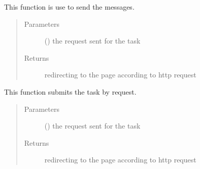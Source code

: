 \documentclass[letterpaper,10pt,english]{sphinxmanual}
\begin{document}
\begin{fulllineitems}
\label{\detokenize{janta:janta.views.send_message}}
This function is use to send the messages.
\begin{quote}\begin{description}
\item[{Parameters}] \leavevmode
{} () \textendash{} the request sent for the task

\item[{Returns}] \leavevmode
redirecting to the page according to http request

\end{description}\end{quote}

\end{fulllineitems}


\begin{fulllineitems}
\label{\detokenize{janta:janta.views.submit_task}}
This function submits the task by request.
\begin{quote}\begin{description}
\item[{Parameters}] \leavevmode
{} () \textendash{} the request sent for the task

\item[{Returns}] \leavevmode
redirecting to the page according to http request

\end{description}\end{quote}

\end{fulllineitems}

\end{document}
